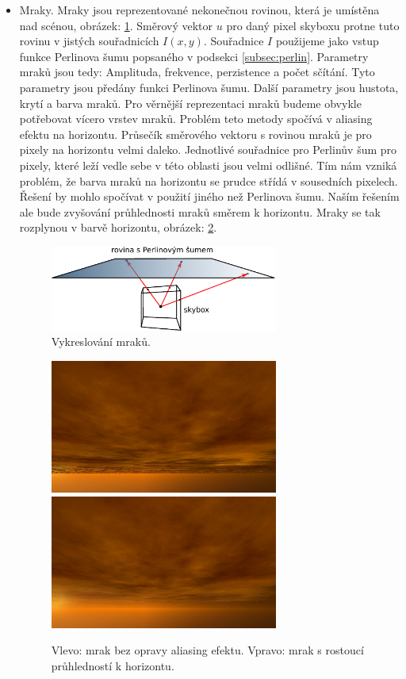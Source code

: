 \begin{itemize}
\item Mraky.
Mraky jsou reprezentované nekonečnou rovinou, která je umístěna nad scénou, obrázek: \ref{fig:skyboxcloud}.
Směrový vektor $u$ pro daný pixel skyboxu protne tuto rovinu v jistých souřadnicích $I(x,y)$.
Souřadnice $I$ použijeme jako vstup funkce Perlinova šumu popsaného v podsekci \ref{subsec:perlin}.
Parametry mraků jsou tedy: Amplituda, frekvence, perzistence a počet sčítání.
Tyto parametry jsou předány funkci Perlinova šumu.
Další parametry jsou hustota, krytí a barva mraků.
Pro věrnější reprezentaci mraků budeme obvykle potřebovat vícero vrstev mraků.
Problém teto metody spočívá v aliasing efektu na horizontu.
Průsečík směrového vektoru s rovinou mraků je pro pixely na horizontu velmi daleko.
Jednotlivé souřadnice pro Perlinův šum pro pixely, které leží vedle sebe v této oblasti jsou velmi odlišné.
Tím nám vzniká problém, že barva mraků na horizontu se prudce střídá v sousedních pixelech.
Řešení by mohlo spočívat v použití jiného než Perlinova šumu.
Naším řešením ale bude zvyšování průhlednosti mraků směrem k horizontu.
Mraky se tak rozplynou v barvě horizontu, obrázek: \ref{fig:cloudalias}.
\begin{figure}[h]
\centering
\includegraphics[width=7.5cm,keepaspectratio]{obr/skyboxcloud.pdf}
\caption{Vykreslování mraků.}
\label{fig:skyboxcloud}
\end{figure}

\begin{figure}[h]
\centering
\includegraphics[width=7.5cm,keepaspectratio]{obr/skyboxalias.jpg}
\includegraphics[width=7.5cm,keepaspectratio]{obr/skyboxantialias.jpg}
\caption{Vlevo: mrak bez opravy aliasing efektu. Vpravo: mrak s rostoucí průhledností k horizontu.}
\label{fig:cloudalias}
\end{figure}


\end{itemize}

